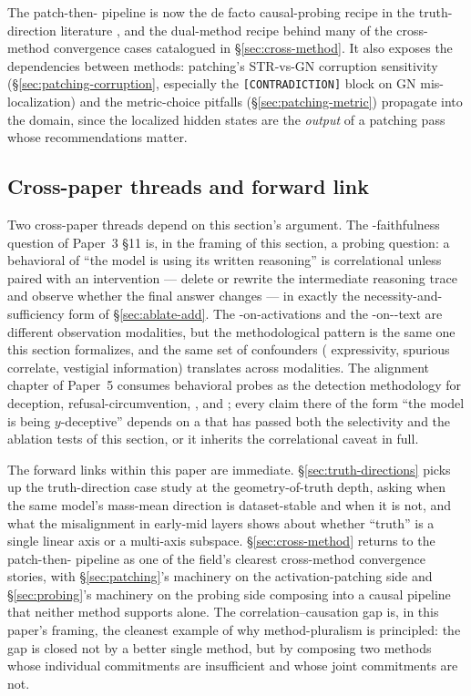 The patch-then- pipeline is now the de facto causal-probing
recipe in the truth-direction literature
\citep{marks-tegmark-2023-truth}, and the dual-method recipe behind
many of the cross-method convergence cases catalogued in
\S\ref{sec:cross-method}. It also exposes the dependencies between
methods: patching's STR-vs-GN corruption sensitivity
(\S\ref{sec:patching-corruption}, especially the
\texttt{[CONTRADICTION]} block on GN mis-localization) and the
metric-choice pitfalls (\S\ref{sec:patching-metric}) propagate into
the  domain, since the localized hidden states are the
\emph{output} of a patching pass whose recommendations matter.

\subsection{Cross-paper threads and forward link}
\label{sec:correlation-causation-forward}

Two cross-paper threads depend on this section's argument.
The -faithfulness question of Paper~3 \S 11 is, in
the framing of this section, a probing question: a behavioral 
of ``the model is using its written reasoning'' is correlational
unless paired with an intervention --- delete or rewrite the
intermediate reasoning trace and observe whether the final answer
changes --- in exactly the necessity-and-sufficiency form of
\S\ref{sec:ablate-add}. The -on-activations and the
-on--text are different observation modalities, but the
methodological pattern is the same one this section formalizes, and
the same set of confounders ( expressivity, spurious correlate,
vestigial information) translates across modalities. The alignment
chapter of Paper~5 consumes behavioral probes as the detection
methodology for deception, refusal-circumvention, , and
; every claim there of the form ``the model is being
$y$-deceptive'' depends on a  that has passed both the
selectivity and the ablation tests of this section, or it inherits
the correlational caveat in full.

The forward links within this paper are immediate.
\S\ref{sec:truth-directions} picks up the truth-direction case study
at the geometry-of-truth depth, asking when the same model's
mass-mean direction is dataset-stable and when it is not, and what
the misalignment in early-mid layers shows about whether
``truth'' is a single linear axis or a multi-axis subspace.
\S\ref{sec:cross-method} returns to the patch-then- pipeline as
one of the field's clearest cross-method convergence stories, with
\S\ref{sec:patching}'s machinery on the activation-patching side
and \S\ref{sec:probing}'s machinery on the probing side composing
into a causal pipeline that neither method supports alone. The
correlation--causation gap is, in this paper's framing, the cleanest
example of why method-pluralism is principled: the gap is closed not
by a better single method, but by composing two methods whose
individual commitments are insufficient and whose joint commitments
are not.
